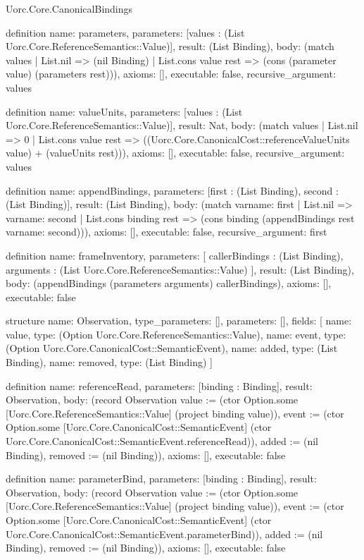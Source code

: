 \begin{lexlean}{Uorc.Core.CanonicalBindings}
\begin{semanticmodule}
definition{
  name: parameters,
  parameters: [values : (List Uorc.Core.ReferenceSemantics::Value)],
  result: (List Binding),
  body: (match values
    | List.nil => (nil Binding)
    | List.cons value rest => (cons (parameter value) (parameters rest))),
  axioms: [],
  executable: false,
  recursive_argument: values
}

definition{
  name: valueUnits,
  parameters: [values : (List Uorc.Core.ReferenceSemantics::Value)],
  result: Nat,
  body: (match values
    | List.nil => 0
    | List.cons value rest => ((Uorc.Core.CanonicalCost::referenceValueUnits value) + (valueUnits rest))),
  axioms: [],
  executable: false,
  recursive_argument: values
}

definition{
  name: appendBindings,
  parameters: [first : (List Binding), second : (List Binding)],
  result: (List Binding),
  body: (match var{name: first}
    | List.nil => var{name: second}
    | List.cons binding rest => (cons binding (appendBindings rest var{name: second}))),
  axioms: [],
  executable: false,
  recursive_argument: first
}

definition{
  name: frameInventory,
  parameters: [
    callerBindings : (List Binding),
    arguments : (List Uorc.Core.ReferenceSemantics::Value)
  ],
  result: (List Binding),
  body: (appendBindings (parameters arguments) callerBindings),
  axioms: [],
  executable: false
}

structure{
  name: Observation,
  type_parameters: [],
  parameters: [],
  fields: [
    {name: value, type: (Option Uorc.Core.ReferenceSemantics::Value)},
    {name: event, type: (Option Uorc.Core.CanonicalCost::SemanticEvent)},
    {name: added, type: (List Binding)},
    {name: removed, type: (List Binding)}
  ]
}

definition{
  name: referenceRead,
  parameters: [binding : Binding],
  result: Observation,
  body: (record Observation {value := (ctor Option.some [Uorc.Core.ReferenceSemantics::Value] (project binding value)), event := (ctor Option.some [Uorc.Core.CanonicalCost::SemanticEvent] (ctor Uorc.Core.CanonicalCost::SemanticEvent.referenceRead)), added := (nil Binding), removed := (nil Binding)}),
  axioms: [],
  executable: false
}

definition{
  name: parameterBind,
  parameters: [binding : Binding],
  result: Observation,
  body: (record Observation {value := (ctor Option.some [Uorc.Core.ReferenceSemantics::Value] (project binding value)), event := (ctor Option.some [Uorc.Core.CanonicalCost::SemanticEvent] (ctor Uorc.Core.CanonicalCost::SemanticEvent.parameterBind)), added := (nil Binding), removed := (nil Binding)}),
  axioms: [],
  executable: false
}


\end{semanticmodule}
\end{lexlean}
